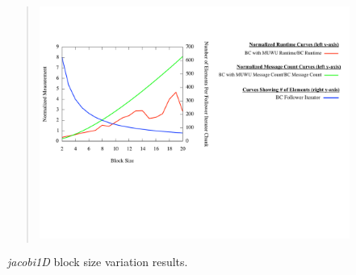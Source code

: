 \begin{figure}
\begin{center}
\renewcommand{\baselinestretch}{1}
\small\normalsize
\begin{quote}
\includegraphics[width=\linewidth]{./Figures/blocksize_variation_exp/jacobi-1d.pdf}
\caption[\textit{jacobi1D} block size variation results]{\textit{jacobi1D} block size variation results.\label{jacobi1D_blocksize_scaling}}
\end{quote}
\end{center}
\end{figure}
